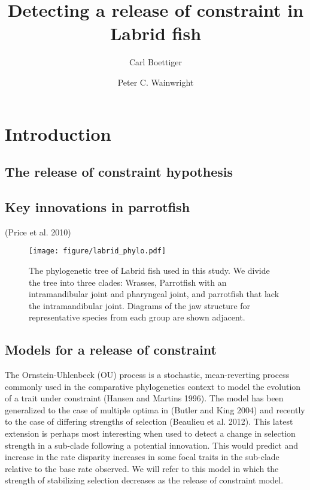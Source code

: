 \documentclass[author-year, review, 12pt]{elsarticle} %
\begin{document}
\begin{frontmatter}
  \title{Detecting a release of constraint in Labrid fish}
  \author[cpb]{Carl Boettiger}
  \author[cpb]{Peter C. Wainwright}
  \address[cpb]{Center for Population Biology, University of California, Davis, California 95616}
 \end{frontmatter}


\section{Introduction}

\subsection{The release of constraint hypothesis}

\subsection{Key innovations in parrotfish}

(Price et al. 2010)

\begin{figure}[htbp]
\centering
\texttt{[image: figure/labrid\_phylo.pdf]}
\caption{The phylogenetic tree of Labrid fish used in this study. We
divide the tree into three clades: Wrasses, Parrotfish with an
intramandibular joint and pharyngeal joint, and parrotfish that lack the
intramandibular joint. Diagrams of the jaw structure for representative
species from each group are shown adjacent.}
\end{figure}

\subsection{Models for a release of constraint}

The Ornstein-Uhlenbeck (OU) process is a stochastic, mean-reverting
process commonly used in the comparative phylogenetics context to model
the evolution of a trait under constraint (Hansen and Martins 1996). The
model has been generalized to the case of multiple optima in (Butler and
King 2004) and recently to the case of differing strengths of selection
(Beaulieu et al. 2012). This latest extension is perhaps most
interesting when used to detect a change in selection strength in a
sub-clade following a potential innovation. This would predict and
increase in the rate disparity increases in some focal traits in the
sub-clade relative to the base rate observed. We will refer to this
model in which the strength of stabilizing selection decreases as the
release of constraint model.
\end{document}
